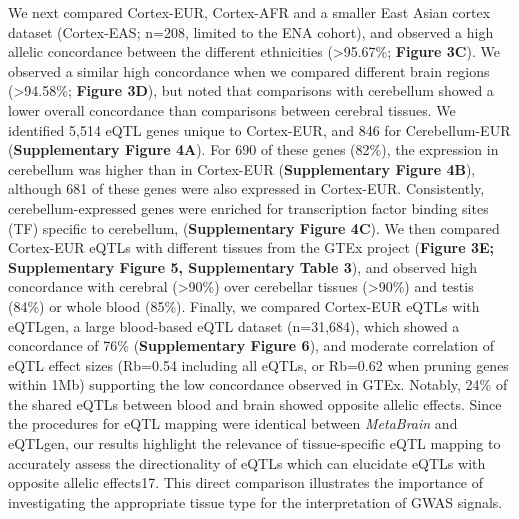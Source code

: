 We next compared Cortex-EUR, Cortex-AFR and a smaller East Asian cortex dataset (Cortex-EAS; n=208, limited to the ENA cohort), and observed a high allelic concordance between the different ethnicities (>95.67\%; \textbf{Figure 3C}). We observed a similar high concordance when we compared different brain regions (>94.58\%; \textbf{Figure 3D}), but noted that comparisons with cerebellum showed a lower overall concordance than comparisons between cerebral tissues. We identified 5,514 eQTL genes unique to Cortex-EUR, and 846 for Cerebellum-EUR (\textbf{Supplementary Figure 4A}). For 690 of these genes (82\%), the expression in cerebellum was higher than in Cortex-EUR (\textbf{Supplementary Figure 4B}), although 681 of these genes were also expressed in Cortex-EUR. Consistently, cerebellum-expressed genes were enriched for transcription factor binding sites (TF) specific to cerebellum, (\textbf{Supplementary Figure 4C}). We then compared Cortex-EUR eQTLs with different tissues from the GTEx project (\textbf{Figure 3E; Supplementary Figure 5, Supplementary Table 3}), and observed high concordance with cerebral (>90\%) over cerebellar tissues (>90\%) and testis (84\%) or whole blood (85\%). Finally, we compared Cortex-EUR eQTLs with eQTLgen, a large blood-based eQTL dataset (n=31,684), which showed a concordance of 76\% (\textbf{Supplementary Figure 6}), and moderate correlation of eQTL effect sizes (Rb=0.54 including all eQTLs, or Rb=0.62 when pruning genes within 1Mb) supporting the low concordance observed in GTEx. Notably, 24\% of the shared eQTLs between blood and brain showed opposite allelic effects. Since the procedures for eQTL mapping were identical between \emph{MetaBrain} and eQTLgen, our results highlight the relevance of tissue-specific eQTL mapping to accurately assess the directionality of eQTLs which can elucidate eQTLs with opposite allelic effects17. This direct comparison illustrates the importance of investigating the appropriate tissue type for the interpretation of GWAS signals. 

